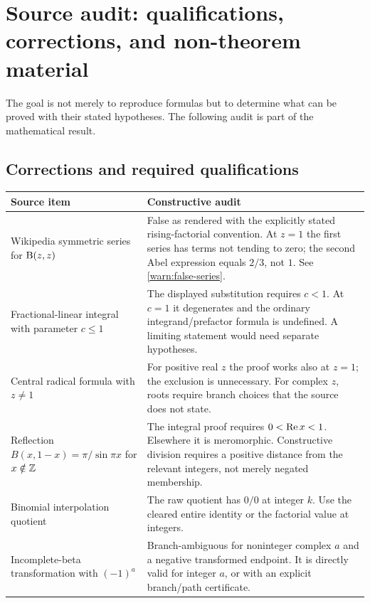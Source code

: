 \section{Source audit: qualifications, corrections, and non-theorem material}
\label{sec:source-audit}

The goal is not merely to reproduce formulas but to determine what can be proved with their stated hypotheses.  The following audit is part of the mathematical result.

\subsection{Corrections and required qualifications}

\begin{longtable}{@{}p{}p{}@{}}
\toprule
Source item & Constructive audit\\
\midrule\endhead
Wikipedia symmetric series for $\mathrm B(z,z)$ &
False as rendered with the explicitly stated rising-factorial convention.  At $z=1$ the first series has terms not tending to zero; the second Abel expression equals $2/3$, not $1$.  See \cref{warn:false-series}.\\

Fractional-linear integral with parameter $c\le1$ &
The displayed substitution requires $c<1$.  At $c=1$ it degenerates and the ordinary integrand/prefactor formula is undefined.  A limiting statement would need separate hypotheses.\\

Central radical formula with $z\ne1$ &
For positive real $z$ the proof works also at $z=1$; the exclusion is unnecessary.  For complex $z$, roots require branch choices that the source does not state.\\

Reflection $B(x,1-x)=\pi/\sin\pi x$ for $x\notin\mathbb Z$ &
The integral proof requires $0<\operatorname{Re} x<1$.  Elsewhere it is meromorphic.  Constructive division requires a positive distance from the relevant integers, not merely negated membership.\\

Binomial interpolation quotient &
The raw quotient has $0/0$ at integer $k$.  Use the cleared entire identity or the factorial value at integers.\\

Incomplete-beta transformation with $(-1)^a$ &
Branch-ambiguous for noninteger complex $a$ and a negative transformed endpoint.  It is directly valid for integer $a$, or with an explicit branch/path certificate.\\


\end{longtable}
